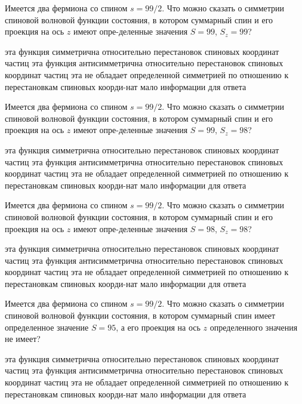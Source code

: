 \documentclass[11pt,a4paper]{exam}
\begin{document}
\begin{questions}
\question Имеется два фермиона со спином $s = 99/2$. Что можно сказать о симметрии спиновой волновой функции состояния, в котором суммарный спин и его проекция на ось $z$ имеют опре-деленные значения $S = 99$, ${S_z} = 99$?
\begin{choices}
\choice эта функция симметрична относительно перестановок спиновых координат частиц
\choice эта функция антисимметрична относительно перестановок спиновых координат частиц
\choice эта не обладает определенной симметрией по отношению к перестановкам спиновых коорди-нат
\choice мало информации для ответа
\end{choices}

\question Имеется два фермиона со спином $s = 99/2$. Что можно сказать о симметрии спиновой волновой функции состояния, в котором суммарный спин и его проекция на ось $z$ имеют опре-деленные значения $S = 99$, ${S_z} = 98$?
\begin{choices}
\choice эта функция симметрична относительно перестановок спиновых координат частиц
\choice эта функция антисимметрична относительно перестановок спиновых координат частиц
\choice эта не обладает определенной симметрией по отношению к перестановкам спиновых коорди-нат
\choice мало информации для ответа
\end{choices}

\question Имеется два фермиона со спином $s = 99/2$. Что можно сказать о симметрии спиновой волновой функции состояния, в котором суммарный спин и его проекция на ось $z$ имеют опре-деленные значения $S = 98$, ${S_z} = 98$?
\begin{choices}
\choice эта функция симметрична относительно перестановок спиновых координат частиц
\choice эта функция антисимметрична относительно перестановок спиновых координат частиц
\choice эта не обладает определенной симметрией по отношению к перестановкам спиновых коорди-нат
\choice мало информации для ответа
\end{choices}

\question Имеется два фермиона со спином $s = 99/2$. Что можно сказать о симметрии спиновой волновой функции состояния, в котором суммарный спин имеет определенное значение $S = 95$, а его проекция на ось $z$ определенного значения не имеет? 
\begin{choices}
\choice эта функция симметрична относительно перестановок спиновых координат частиц
\choice эта функция антисимметрична относительно перестановок спиновых координат частиц
\choice эта не обладает определенной симметрией по отношению к перестановкам спиновых коорди-нат
\choice мало информации для ответа
\end{choices}


\end{questions}
\end{document}
